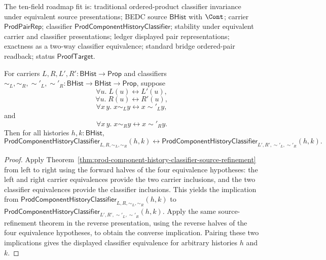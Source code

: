 \begin{theorem}
\label{thm:prod-component-history-classifier-source-equivalence}
The ten-field roadmap fit is: traditional ordered-product classifier
invariance under equivalent source presentations; BEDC source $\mathsf{BHist}$
with $\Cont$; carrier $\mathsf{ProdPairRep}$; classifier
$\mathsf{ProdComponentHistoryClassifier}$; stability under equivalent carrier
and classifier presentations; ledger displayed pair representations; exactness
as a two-way classifier equivalence; standard bridge ordered-pair readback;
status $\mathsf{ProofTarget}$.

For carriers $L,R,L',R':\mathsf{BHist}\to\mathsf{Prop}$ and classifiers
$\sim_L,\sim_R,\sim'_L,\sim'_R:\mathsf{BHist}\to\mathsf{BHist}\to\mathsf{Prop}$,
suppose
$$
\forall u.\;L(u)\leftrightarrow L'(u),
$$
$$
\forall u.\;R(u)\leftrightarrow R'(u),
$$
$$
\forall x\,y.\;x\sim_L y\leftrightarrow x\sim'_L y,
$$
and
$$
\forall x\,y.\;x\sim_R y\leftrightarrow x\sim'_R y.
$$
Then for all histories $h,k:\mathsf{BHist}$,
$$
\mathsf{ProdComponentHistoryClassifier}_{L,R,\sim_L,\sim_R}(h,k)
\leftrightarrow
\mathsf{ProdComponentHistoryClassifier}_{L',R',\sim'_L,\sim'_R}(h,k).
$$
\end{theorem}
\begin{proof}
Apply Theorem~\ref{thm:prod-component-history-classifier-source-refinement}
from left to right using the forward halves of the four equivalence hypotheses:
the left and right carrier equivalences provide the two carrier inclusions, and
the two classifier equivalences provide the classifier inclusions. This yields
the implication from
$\mathsf{ProdComponentHistoryClassifier}_{L,R,\sim_L,\sim_R}(h,k)$ to
$\mathsf{ProdComponentHistoryClassifier}_{L',R',\sim'_L,\sim'_R}(h,k)$.
Apply the same source-refinement theorem in the reverse presentation, using the
reverse halves of the four equivalence hypotheses, to obtain the converse
implication. Pairing these two implications gives the displayed classifier
equivalence for arbitrary histories $h$ and $k$.
\end{proof}

